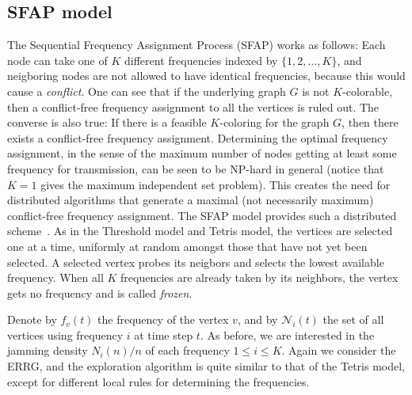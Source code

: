 \documentclass[11pt,a4paper, reqno]{article}
\begin{document}
\subsection{SFAP model}
The Sequential Frequency Assignment Process (SFAP) works as follows: Each node can take one of $K$ different frequencies indexed by $\{1,2,\ldots,K\}$, and neigboring nodes are not allowed to have identical frequencies, because this would cause a \emph{conflict}.
One can see that if the underlying graph $G$ is not $K$-colorable, then a conflict-free frequency assignment to all the vertices is ruled out. The converse is also true: If there is a feasible $K$-coloring for the graph $G$, then there exists a conflict-free frequency assignment.
Determining the optimal frequency assignment, in the sense of the maximum number of nodes getting at least some frequency for transmission, can be seen to be NP-hard in general (notice that $K=1$ gives the maximum independent set problem). This creates the need for distributed algorithms that generate a maximal (not necessarily maximum) conflict-free frequency assignment. The SFAP model provides such a distributed scheme~\cite{FD07}. 
As in the Threshold model and Tetris model, the vertices are selected one at a time, uniformly at random amongst those that have not yet been selected. A selected vertex probes its neigbors and selects the lowest available frequency. When all $K$ frequencies are already taken by its neighbors, the vertex gets no frequency and is called {\it frozen}.

Denote by $f_v(t)$ the frequency of the vertex $v$, and by $\mathcal{N}_i(t)$ the set of all vertices using frequency $i$ at time step $t$. 
As before, we are interested in the jamming density $N_i(n)/n$ of each frequency $1\leq i\leq K$. Again we consider the ERRG, and the exploration algorithm is quite similar to that of the Tetris model, except for different local rules for determining the frequencies.
\end{document}
